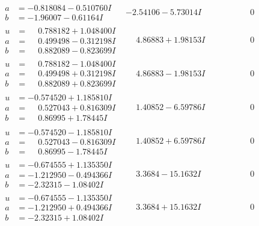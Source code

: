 \documentclass[1p]{elsarticle_modified}
\theoremstyle{definition}
\begin{document}
$$\begin{array}{c|c|c}
\begin{aligned}
a &= -0.818084 - 0.510760 I \\
b &= -1.96007 - 0.61164 I\end{aligned}
 & -2.54106 - 5.73014 I & \phantom{-0.000000 } 0 \\ \hline\begin{aligned}
u &= \phantom{-}0.788182 + 1.048400 I \\
a &= \phantom{-}0.499498 - 0.312198 I \\
b &= \phantom{-}0.882089 - 0.823699 I\end{aligned}
 & \phantom{-}4.86883 + 1.98153 I & \phantom{-0.000000 } 0 \\ \hline\begin{aligned}
u &= \phantom{-}0.788182 - 1.048400 I \\
a &= \phantom{-}0.499498 + 0.312198 I \\
b &= \phantom{-}0.882089 + 0.823699 I\end{aligned}
 & \phantom{-}4.86883 - 1.98153 I & \phantom{-0.000000 } 0 \\ \hline\begin{aligned}
u &= -0.574520 + 1.185810 I \\
a &= \phantom{-}0.527043 + 0.816309 I \\
b &= \phantom{-}0.86995 + 1.78445 I\end{aligned}
 & \phantom{-}1.40852 - 6.59786 I & \phantom{-0.000000 } 0 \\ \hline\begin{aligned}
u &= -0.574520 - 1.185810 I \\
a &= \phantom{-}0.527043 - 0.816309 I \\
b &= \phantom{-}0.86995 - 1.78445 I\end{aligned}
 & \phantom{-}1.40852 + 6.59786 I & \phantom{-0.000000 } 0 \\ \hline\begin{aligned}
u &= -0.674555 + 1.135350 I \\
a &= -1.212950 - 0.494366 I \\
b &= -2.32315 - 1.08402 I\end{aligned}
 & \phantom{-}3.3684 - 15.1632 I & \phantom{-0.000000 } 0 \\ \hline\begin{aligned}
u &= -0.674555 - 1.135350 I \\
a &= -1.212950 + 0.494366 I \\
b &= -2.32315 + 1.08402 I\end{aligned}
 & \phantom{-}3.3684 + 15.1632 I & \phantom{-0.000000 } 0 \\ \hline\begin{aligned}

\end{aligned}
\end{array}$$
\end{document}
